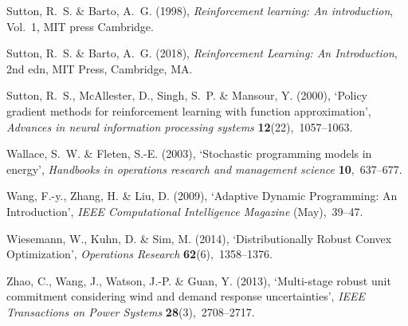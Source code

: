 \documentclass[11pt,oneside,fleqn,reqno,titlepage]{article}
\begin{document}
\begin{thebibliography}{xx}
Sutton, R.~S. \& Barto, A.~G.  (1998), {\em Reinforcement learning: An
  introduction}, Vol.~1, MIT press Cambridge.

Sutton, R.~S. \& Barto, A.~G.  (2018), {\em {Reinforcement Learning: An
  Introduction}}, 2nd edn, MIT Press, Cambridge, MA.

Sutton, R.~S., McAllester, D., Singh, S.~P. \& Mansour, Y.  (2000), `{Policy
  gradient methods for reinforcement learning with function approximation}',
  {\em Advances in neural information processing systems} {\bf
  12}(22),~1057--1063.

Wallace, S.~W. \& Fleten, S.-E.  (2003), `Stochastic programming models in
  energy', {\em Handbooks in operations research and management science} {\bf
  10},~637--677.

Wang, F.-y., Zhang, H. \& Liu, D.  (2009), `{Adaptive Dynamic Programming: An
  Introduction}', {\em IEEE Computational Intelligence Magazine} (May),~39--47.

Wiesemann, W., Kuhn, D. \& Sim, M.  (2014), `{Distributionally Robust Convex
  Optimization}', {\em Operations Research} {\bf 62}(6),~1358--1376.

Zhao, C., Wang, J., Watson, J.-P. \& Guan, Y.  (2013), `Multi-stage robust unit
  commitment considering wind and demand response uncertainties', {\em IEEE
  Transactions on Power Systems} {\bf 28}(3),~2708--2717.

\end{thebibliography}



%
\end{document}
